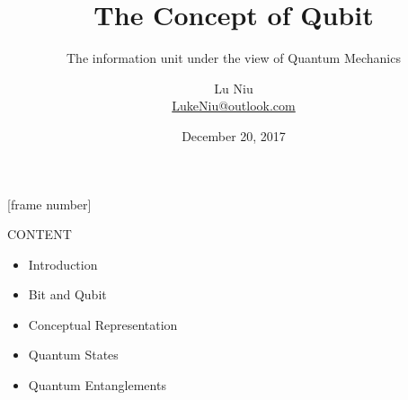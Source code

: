 \documentclass[beamer,serif]{beamer}
\begin{document}
{
	[frame number]	%
}

\author[Lu Niu]
{
	Lu Niu \\
	\medskip
	{\small \url{LukeNiu@outlook.com}}
}
\date{December 20, 2017}

\title{The Concept of Qubit}
\subtitle{The information unit under the view of Quantum Mechanics}

\setlength{\parindent}{1em}

\begin{frame}%
	\begin{titlepage}
	\end{titlepage}
\end{frame}

\begin{frame}{CONTENT}{}
\begin{itemize}
	\item Introduction
	\item Bit and Qubit
	\item Conceptual Representation
	\item Quantum States
	\item Quantum Entanglements
\end{itemize}
\end{frame}
\end{document}
